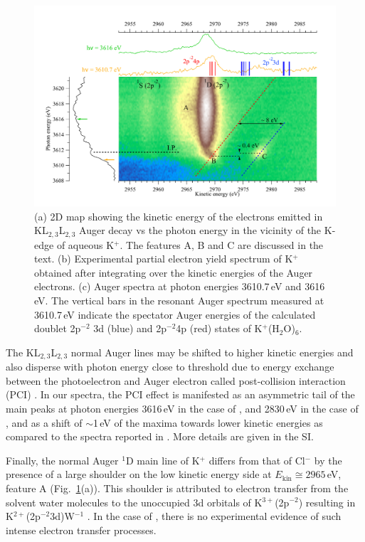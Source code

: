 \begin{figure}[h!]
\centering
\includegraphics[scale=0.55]{figures/k_2dmap.pdf}
\caption{(a) 2D map showing the kinetic energy of the electrons emitted in KL$_{2,3}$L$_{2,3}$ Auger decay vs the photon energy in the vicinity of the K-edge of aqueous K$^{+}$. The features A, B and C are discussed in the text.
(b) Experimental partial electron yield spectrum of K$^{+}$ obtained after integrating over the kinetic energies of the Auger electrons.
(c) Auger spectra at photon energies 3610.7\,eV and 3616\,eV. The vertical bars in the resonant Auger spectrum measured at 3610.7\,eV indicate the spectator Auger energies of the calculated doublet 2p$^{-2}$ 3d (blue) and 2p$^{-2}$4p (red) states of K$^{+}$(H$_2$O)$_6$.}
\label{fg:2dmap_k}
\end{figure}


The KL$_{2,3}$L$_{2,3}$ normal Auger lines may be shifted to higher kinetic energies and also disperse with photon energy close to threshold due to energy exchange between the photoelectron and Auger electron called post-collision interaction (PCI) \citep{russek86:911,guillemin15:012503}. In our spectra, the PCI effect is manifested as an asymmetric tail of the main peaks at photon energies 3616\,eV in the case of \ki, and 2830\,eV in the case of \cli, and as a shift of $\sim$1\,eV of the maxima towards lower kinetic energies as compared to the spectra reported in \citep{ceolin17:263003}. More details are given in the SI.


Finally, the normal Auger $^1$D main line of K$^{+}$ differs from that of Cl$^{-}$ by the presence of a large shoulder on the low kinetic energy side at $E_{\text{kin}} \cong 2965$\,eV, feature A (Fig.\ \ref{fg:2dmap_k}(a)). This shoulder is attributed to electron transfer from the solvent water molecules to the unoccupied 3d orbitals of K$^{3+}$(2p$^{-2}$) resulting in K$^{2+}$(2p$^{-2}$3d)W$^{-1}$ \citep{ceolin17:263003}. In the case of \cli, there is no experimental evidence of such intense electron transfer processes.


